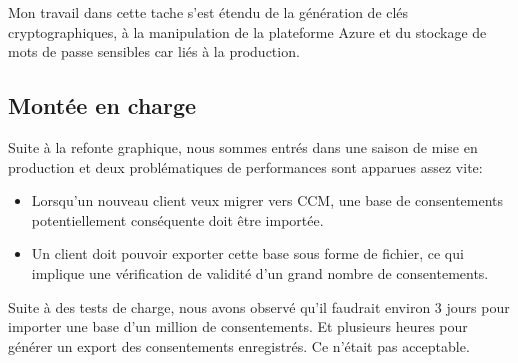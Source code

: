 \documentclass[12pt, a4paper]{report}
\newcommand\tab[1][1cm]{\hspace*{#1}}
\begin{document}
Mon travail dans cette tache s'est étendu de la génération de clés cryptographiques, à la manipulation de la plateforme Azure et du stockage de mots de passe sensibles car liés à la production.
\subsection{Montée en charge}
\tab{} Suite à la refonte graphique, nous sommes entrés dans une saison de mise en production et deux problématiques de performances sont apparues assez vite:
\begin{itemize}
    \item Lorsqu'un nouveau client veux migrer vers CCM, une base de consentements potentiellement conséquente doit être importée.
    \item Un client doit pouvoir exporter cette base sous forme de fichier, ce qui implique une vérification de validité d'un grand nombre de consentements.
\end{itemize}

Suite à des tests de charge, nous avons observé qu'il faudrait environ 3 jours pour importer une base d'un million de consentements. Et plusieurs heures pour générer un export des consentements enregistrés. Ce n'était pas acceptable.\newpage
\end{document}
